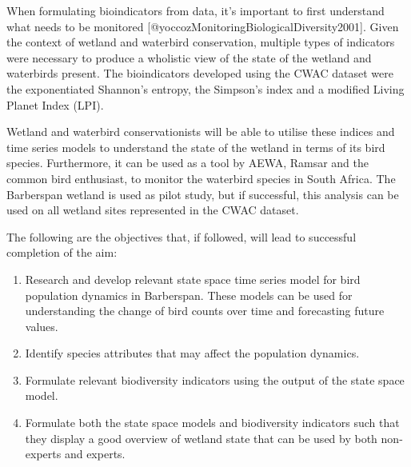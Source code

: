 \documentclass[
]{article}
\providecommand{\tightlist}{%
  \setlength{\itemsep}{0pt}\setlength{\parskip}{0pt}}
\begin{document}
When formulating bioindicators from data, it's important to first
understand what needs to be monitored
{[}@yoccozMonitoringBiologicalDiversity2001{]}. Given the context of
wetland and waterbird conservation, multiple types of indicators were
necessary to produce a wholistic view of the state of the wetland and
waterbirds present. The bioindicators developed using the CWAC dataset
were the exponentiated Shannon's entropy, the Simpson's index and a
modified Living Planet Index (LPI).

Wetland and waterbird conservationists will be able to utilise these
indices and time series models to understand the state of the wetland in
terms of its bird species. Furthermore, it can be used as a tool by
AEWA, Ramsar and the common bird enthusiast, to monitor the waterbird
species in South Africa. The Barberspan wetland is used as pilot study,
but if successful, this analysis can be used on all wetland sites
represented in the CWAC dataset.

The following are the objectives that, if followed, will lead to
successful completion of the aim:

\begin{enumerate}
\def\labelenumi{\arabic{enumi}.}
\tightlist
\item
  Research and develop relevant state space time series model for bird
  population dynamics in Barberspan. These models can be used for
  understanding the change of bird counts over time and forecasting
  future values.
\item
  Identify species attributes that may affect the population dynamics.
\item
  Formulate relevant biodiversity indicators using the output of the
  state space model.
\item
  Formulate both the state space models and biodiversity indicators such
  that they display a good overview of wetland state that can be used by
  both non-experts and experts.
\end{enumerate}
\end{document}
